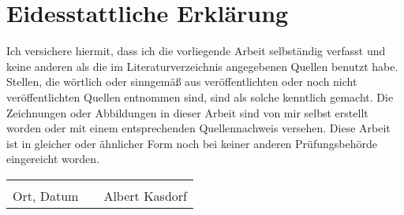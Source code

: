 %
%

%
%

\chapter*{Eidesstattliche Erklärung}

\thispagestyle{empty}


Ich versichere hiermit, dass ich die vorliegende Arbeit selbständig verfasst und keine anderen als die im Literaturverzeichnis angegebenen Quellen benutzt habe. Stellen, die wörtlich oder sinngemäß aus veröffentlichten oder noch nicht veröffentlichten Quellen entnommen sind, sind als solche kenntlich gemacht. Die Zeichnungen oder Abbildungen in dieser Arbeit sind von mir selbst erstellt worden oder mit einem entsprechenden Quellennachweis versehen. Diese Arbeit ist in gleicher oder ähnlicher Form noch bei keiner anderen Prüfungsbehörde eingereicht worden.

\vspace{1cm}

\begin{center}
\begin{tabular}[h]{lp{2cm}p{5.5cm}}
& & \\
\cline{1-1}\cline{3-3}
Ort, Datum& & Albert Kasdorf\\
\end{tabular}
\end{center}